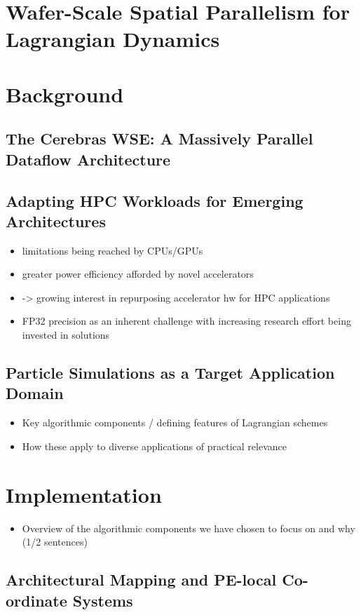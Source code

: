 \documentclass[review, anonymous, acmsmall]{acmart}
\begin{document}
\section{Wafer-Scale Spatial Parallelism for Lagrangian Dynamics}

\section{Background}
\subsection{The Cerebras WSE: A Massively Parallel Dataflow Architecture}
\subsection{Adapting HPC Workloads for Emerging Architectures}
\begin{itemize}
  \item limitations being reached by CPUs/GPUs
  \item greater power efficiency afforded by novel accelerators
  \item -> growing interest in repurposing accelerator hw for HPC applications
  \item FP32 precision as an inherent challenge with increasing research effort being invested in solutions
\end{itemize}
\subsection{Particle Simulations as a Target Application Domain}
\begin{itemize}
  \item Key algorithmic components / defining features of Lagrangian schemes
  \item How these apply to diverse applications of practical relevance
\end{itemize}

\section{Implementation}
\begin{itemize}
  \item Overview of the algorithmic components we have chosen to focus on and why (1/2 sentences) 
\end{itemize}
\subsection{Architectural Mapping and PE-local Co-ordinate Systems}
\end{document}
